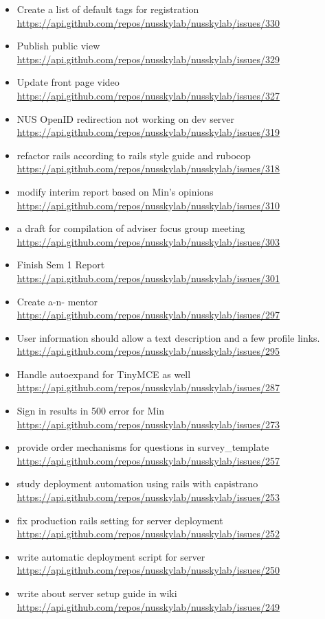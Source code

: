 {\begin{itemize}[noitemsep]
    \item Create a list of default tags for registration \url{https://api.github.com/repos/nusskylab/nusskylab/issues/330} 
    \item Publish public view \url{https://api.github.com/repos/nusskylab/nusskylab/issues/329} 
    \item Update front page video \url{https://api.github.com/repos/nusskylab/nusskylab/issues/327} 
    \item NUS OpenID redirection not working on dev server \url{https://api.github.com/repos/nusskylab/nusskylab/issues/319} 
    \item refactor rails according to rails style guide and rubocop \url{https://api.github.com/repos/nusskylab/nusskylab/issues/318} 
    \item modify interim report based on Min's opinions \url{https://api.github.com/repos/nusskylab/nusskylab/issues/310} 
    \item a draft for compilation of adviser focus group meeting \url{https://api.github.com/repos/nusskylab/nusskylab/issues/303} 
    \item Finish Sem 1 Report \url{https://api.github.com/repos/nusskylab/nusskylab/issues/301} 
    \item Create a-n- mentor \url{https://api.github.com/repos/nusskylab/nusskylab/issues/297} 
    \item User information should allow a text description and a few profile links. \url{https://api.github.com/repos/nusskylab/nusskylab/issues/295} 
    \item Handle autoexpand for TinyMCE as well \url{https://api.github.com/repos/nusskylab/nusskylab/issues/287} 
    \item Sign in results in 500 error for Min \url{https://api.github.com/repos/nusskylab/nusskylab/issues/273} 
    \item provide order mechanisms for questions in survey\_template \url{https://api.github.com/repos/nusskylab/nusskylab/issues/257} 
    \item study deployment automation using rails with capistrano \url{https://api.github.com/repos/nusskylab/nusskylab/issues/253} 
    \item fix production rails setting for server deployment \url{https://api.github.com/repos/nusskylab/nusskylab/issues/252} 
    \item write automatic deployment script for server \url{https://api.github.com/repos/nusskylab/nusskylab/issues/250} 
    \item write about server setup guide in wiki \url{https://api.github.com/repos/nusskylab/nusskylab/issues/249} 

\end{itemize}}
